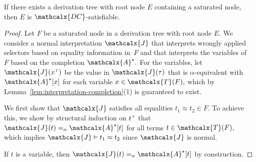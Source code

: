 \documentclass[smallcondensed,draft]{svjour3}
\newcommand\typ[1]{^{\vthinspace #1}}
\newcommand\afterDot{\;} %
\newcommand{\Ec}{E}
\newcommand{\Fc}{F}
\newcommand{\teq}{\approx}
\newcommand{\interp}[2]{#1(#2)}
\newcommand{\ec}[1]{[#1]}
\newcommand{\J}{\mathcalx{J}}
\newcommand{\Val}{\mathcalx{A}\vvthinspace}
\newcommand{\ValC}{\smash{\mathcalx{A}^\star}}
\newcommand{\aequiv}{\mathrel{=_\alpha}}
\newcommand{\vsim}{\aequiv}
\newcommand{\thD}{\mathcalx{DC}}
\newcommand\Terms{\mathcalx{T}}
\newcommand\vvthinspace{\kern+0.041667em}
\newcommand\vthinspace{\kern+0.083333em}
\begin{document}
\begin{theorem}%
\label{thm:ss}%
\afterDot
If there exists a derivation tree with root node $\Ec$ containing a saturated node, then $\Ec$ is $\thD$-satisfiable.
\end{theorem}
\begin{proof}
Let $\Fc$ be a saturated node in a derivation tree with root node $\Ec.$
We consider a normal interpretation $\J$
that interprets wrongly applied selectors based on equality information in~$\Fc$
and that interprets the variables of $\Fc$ based on the completion $\ValC.$
For the variables, let $\interp{\J}{x\typ{\tau}}$ be the value in $\J(\tau)$ that is $\alpha$-equivalent
with $\ValC \ec{x}$ for each variable $x \in \Terms(\Fc),$
which by Lemma~\ref{lem:interpretation-completion}(1) is guaranteed to exist.

We first show that $\J$ satisfies all equalities $t_1 \teq t_2 \in \Fc\!.$ %
To achieve this, we show
by structural induction on $t\typ\tau$
that $\interp{\J}{t} \aequiv \ValC \ec{t}$ for all terms $t \in \Terms( \Fc ),$
which implies $\J \vDash t_1 \teq t_2$ since $\J$ is normal.

If $t$ is a variable, then $\interp{\J}{t} \vsim \ValC \ec{ t }$ by construction.


\end{proof}
\end{document}
